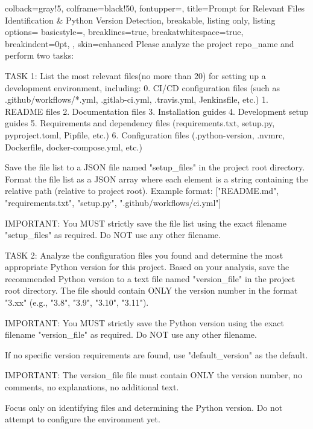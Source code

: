 \newpage
\begin{tcblisting}{
  colback=gray!5,
  colframe=black!50,
  fontupper=\ttfamily,
  title=Prompt for Relevant Files Identification \& Python Version Detection,
  breakable,
  listing only,
  listing options={
    basicstyle=\ttfamily\small,
    breaklines=true,
    breakatwhitespace=true,
    breakindent=0pt,
  },
  skin=enhanced
}
Please analyze the project {repo_name} and perform two tasks:

TASK 1: List the most relevant files(no more than 20) for setting up a development environment, including:
0. CI/CD configuration files (such as .github/workflows/*.yml, .gitlab-ci.yml, .travis.yml, Jenkinsfile, etc.)
1. README files
2. Documentation files  
3. Installation guides
4. Development setup guides
5. Requirements and dependency files (requirements.txt, setup.py, pyproject.toml, Pipfile, etc.)
6. Configuration files (.python-version, .nvmrc, Dockerfile, docker-compose.yml, etc.)

Save the file list to a JSON file named "{setup_files}" in the project root directory.
Format the file list as a JSON array where each element is a string containing the relative path (relative to project root).
Example format: ["README.md", "requirements.txt", "setup.py", ".github/workflows/ci.yml"]

IMPORTANT: You MUST strictly save the file list using the exact filename "{setup_files}" as required. Do NOT use any other filename.

TASK 2: Analyze the configuration files you found and determine the most appropriate Python version for this project.
Based on your analysis, save the recommended Python version to a text file named "{version_file}" in the project root directory.
The file should contain ONLY the version number in the format "3.xx" (e.g., "3.8", "3.9", "3.10", "3.11").

IMPORTANT: You MUST strictly save the Python version using the exact filename "{version_file}" as required. Do NOT use any other filename.

If no specific version requirements are found, use "{default_version}" as the default.

IMPORTANT: The {version_file} file must contain ONLY the version number, no comments, no explanations, no additional text.

Focus only on identifying files and determining the Python version. Do not attempt to configure the environment yet.
\end{tcblisting}

